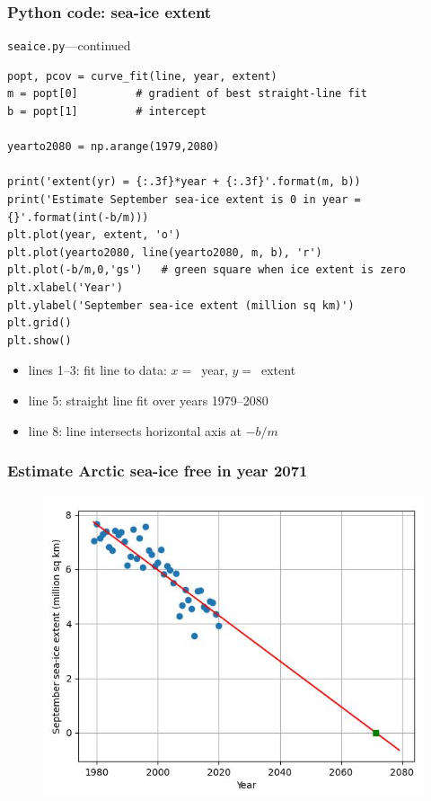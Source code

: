\documentclass[english,14pt]{beamer}
\begin{document}

\begin{frame}[fragile]

\frametitle{Python code: sea-ice extent}

\vspace*{-3mm}

\texttt{seaice.py}---continued
\vspace*{-1mm}
\begin{lstlisting}[style=CStyle,basicstyle=\scriptsize]
popt, pcov = curve_fit(line, year, extent)
m = popt[0]         # gradient of best straight-line fit
b = popt[1]         # intercept

yearto2080 = np.arange(1979,2080)

print('extent(yr) = {:.3f}*year + {:.3f}'.format(m, b))
print('Estimate September sea-ice extent is 0 in year = {}'.format(int(-b/m)))
plt.plot(year, extent, 'o')
plt.plot(yearto2080, line(yearto2080, m, b), 'r')
plt.plot(-b/m,0,'gs')   # green square when ice extent is zero
plt.xlabel('Year')
plt.ylabel('September sea-ice extent (million sq km)')
plt.grid()
plt.show()
\end{lstlisting}
\vspace*{-2mm}
\begin{itemize}
	\item lines 1--3: fit line to data: $x=$~year, $y=$~extent
	\item line 5: straight line fit over years 1979--2080
	\item line 8: line intersects horizontal axis at $-b/m$
\end{itemize}

\end{frame}


\begin{frame}[fragile]

\frametitle{Estimate Arctic sea-ice free in year 2071}

\begin{figure}[ht]
	\centering
	\includegraphics[width=.8\textwidth]{figures/seaiceextentOutput}
\end{figure}

\end{frame}
\end{document}
